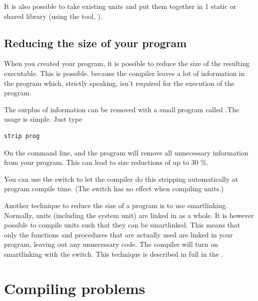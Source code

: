 It is also possible to take existing units and put them
together in 1 static or shared library (using the  tool,
).

\section{Reducing the size of your program}

When you created your program, it is possible to reduce the size of the
resulting executable. This is possible, because the compiler leaves a
lot of information in the program which, strictly speaking, isn't required
for the execution of the program.

The surplus of information can be removed with a small program
called .The usage is simple. Just type
\begin{verbatim}
strip prog
\end{verbatim}
On the command line, and the  program will remove all unnecessary
information from your program. This can lead to size reductions of up to
30 \%.

You can use the  switch to let the compiler do this stripping
automatically at program compile time. (The switch has no effect when
compiling units.)

Another technique to reduce the size of a program is to use smartlinking.
Normally, units (including the system unit) are linked in as a whole.
It is however possible to compile units such that they can be smartlinked.
This means that only the functions and procedures that are actually used
are linked in your program, leaving out any unnecessary code. The compiler
will turn on smartlinking with the  switch. This technique is
described in full in the \progref.

\chapter{Compiling problems}

